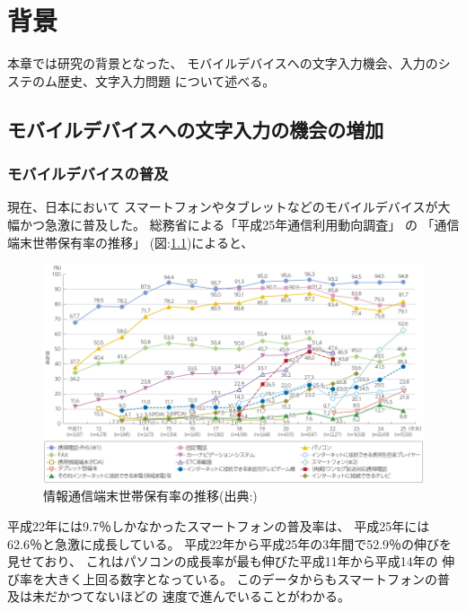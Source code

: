 \chapter{背景}
\label{chap:background}

本章では研究の背景となった、
モバイルデバイスへの文字入力機会、入力のシステのム歴史、文字入力問題
について述べる。

\newpage
\section{モバイルデバイスへの文字入力の機会の増加}

\subsection{モバイルデバイスの普及}

現在、日本において
スマートフォンやタブレットなどのモバイルデバイスが大幅かつ急激に普及した。
総務省による「平成25年通信利用動向調査」
\cite{communicationreport}の
「通信端末世帯保有率の推移」
(図:\ref{fig:mobiledevicespread})によると、
\begin{figure}
  \begin{center}
    \includegraphics[width=160mm,bb=0 0 856 494]{images/mobiledevicespread.png}
    \caption{情報通信端末世帯保有率の推移(出典:\cite{communicationreport})}
    \label{fig:mobiledevicespread}
  \end{center}
\end{figure}
平成22年には9.7％しかなかったスマートフォンの普及率は、
平成25年には62.6％と急激に成長している。
平成22年から平成25年の3年間で52.9％の伸びを見せており、
これはパソコンの成長率が最も伸びた平成11年から平成14年の
伸び率を大きく上回る数字となっている。
このデータからもスマートフォンの普及は未だかつてないほどの
速度で進んでいることがわかる。

